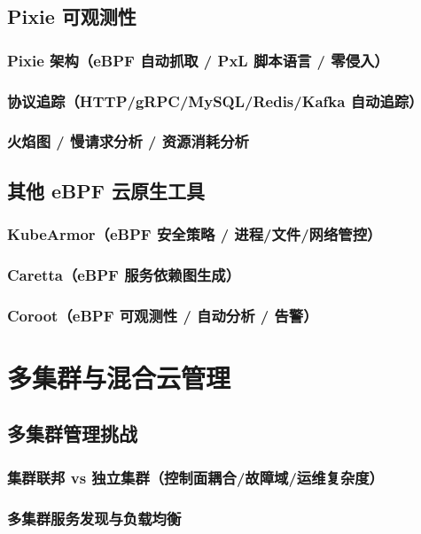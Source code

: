 \documentclass[12pt,UTF8]{ctexbook}
\begin{document}
  \section{Pixie 可观测性}
    \subsection{Pixie 架构（eBPF 自动抓取 / PxL 脚本语言 / 零侵入）}
    \subsection{协议追踪（HTTP/gRPC/MySQL/Redis/Kafka 自动追踪）}
    \subsection{火焰图 / 慢请求分析 / 资源消耗分析}

  \section{其他 eBPF 云原生工具}
    \subsection{KubeArmor（eBPF 安全策略 / 进程/文件/网络管控）}
    \subsection{Caretta（eBPF 服务依赖图生成）}
    \subsection{Coroot（eBPF 可观测性 / 自动分析 / 告警）}


\chapter{多集群与混合云管理}
\label{chap:multi-cluster-hybrid}

  \section{多集群管理挑战}
    \subsection{集群联邦 vs 独立集群（控制面耦合/故障域/运维复杂度）}
    \subsection{多集群服务发现与负载均衡}
\end{document}
